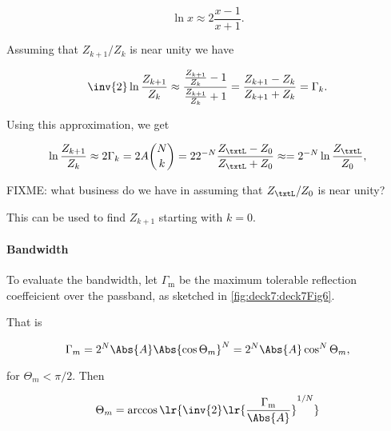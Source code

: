 \begin{equation}\label{eqn:uwavesDeck7MultisectionTransformersCore:340}
\ln x \approx 2 \frac{x -1}{x+1}.
\end{equation}

Assuming that \( Z_{k+1}/Z_k \) is near unity we have

\begin{dmath}\label{eqn:uwavesDeck7MultisectionTransformersCore:360}
\inv{2} \ln \frac{Z_{k+1}}{Z_k} 
\approx
\frac{ \frac{Z_{k+1}}{Z_k} - 1 }{\frac{Z_{k+1}}{Z_k} + 1}
=
\frac{ Z_{k+1} - Z_k }{Z_{k+1} + Z_k}
=
\Gamma_k.
\end{dmath}

Using this approximation, we get

\begin{dmath}\label{eqn:uwavesDeck7MultisectionTransformersCore:380}
\ln \frac{Z_{k+1}}{Z_k}
\approx
2 \Gamma_k 
= 2 A \binom{N}{k}
= 2 2^{-N} \frac{Z_\txtL - Z_0}{Z_\txtL + Z_0}
\approx
= 2^{-N} \ln \frac{Z_\txtL}{Z_0},
\end{dmath}

FIXME: what business do we have in assuming that \( Z_\txtL/Z_0 \) is near unity?

This can be used to find \( Z_{k+1} \) starting with \( k = 0 \).

\paragraph{Bandwidth}

To evaluate the bandwidth, let \( \Gamma_{\mathrm{m}} \) be the maximum tolerable reflection coeffeicient over the passband, as sketched in \cref{fig:deck7:deck7Fig6}.


That is

\begin{dmath}\label{eqn:uwavesDeck7MultisectionTransformersCore:400}
\Gamma_m 
= 2^N \Abs{A} \Abs{\cos \Theta_m }^N 
= 2^N \Abs{A} \cos^N \Theta_m,
\end{dmath}

for \( \Theta_m < \pi/2 \).  Then

\begin{dmath}\label{eqn:uwavesDeck7MultisectionTransformersCore:420}
\Theta_m = \arccos\lr{ \inv{2} \lr{ \frac{\Gamma_{\mathrm{m}}}{\Abs{A}}}^{1/N} }
\end{dmath}

